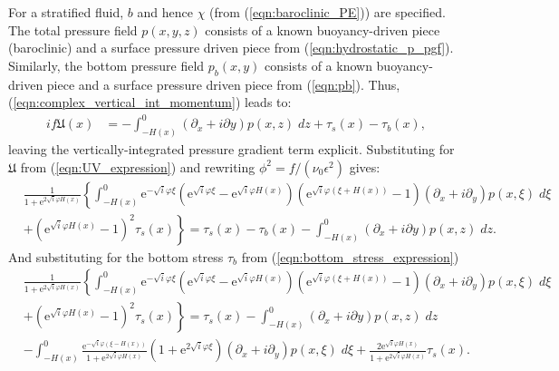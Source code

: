 \documentclass[10pt]{amsart}
\begin{document}
For a stratified fluid, $b$ and hence $\chi$ (from (\ref{eqn:baroclinic_PE})) are specified. 
The total pressure field $p(x,y,z)$ consists of a known buoyancy-driven piece (baroclinic) and a surface pressure driven piece from (\ref{eqn:hydrostatic_p_pgf}).
Similarly, the bottom pressure field $p_b(x,y)$ consists of a known buoyancy-driven piece and a surface pressure driven piece from (\ref{eqn:pb}).
Thus, (\ref{eqn:complex_vertical_int_momentum}) leads to:
\begin{align}
i f \mathfrak{U}(x) & = -
\int_{-H(x)}^{0} \left( \partial_x + i \partial y \right) p(x,z) \; dz 
+ \tau_s(x)  - \tau_b (x) ,
 \end{align}
 leaving the vertically-integrated pressure gradient term explicit.
 Substituting for $\mathfrak{U}$ from (\ref{eqn:UV_expression}) and rewriting $\phi^2 = f / (\nu_0 \epsilon^2)$ gives:
 \begin{align}
& \frac{1 }{{ 1 + \mathrm{e}^{2 \sqrt{i} \varphi H(x )} } } 
\left\{
 \int_{-H(x)}^{0} 
\mathrm{e}^{-\sqrt{i} \varphi \xi} 
\left(
\mathrm{e}^{\sqrt{i} \varphi \xi} - 
\mathrm{e}^{\sqrt{i} \varphi H(x)} 
\right) \left(
\mathrm{e}^{\sqrt{i} \varphi  \left( \xi + H(x) \right)} - 1
\right)
 \left( \partial_x  + i \partial_y  \right) p( x, \xi)  \; d \xi  \right. \nonumber \\
& + \left.
\left( 
\mathrm{e}^{\sqrt{i} \varphi  H(x) }   - 1   
\right)^2
\tau_s (x)  \right\} 
= 
\tau_s (x)  - \tau_b (x) - 
\int_{-H(x)}^{0} \left( \partial_x + i \partial y \right) p(x,z) \; dz .
\end{align}
And substituting for the bottom stress $\tau_b$ from (\ref{eqn:bottom_stress_expression})
 \begin{align}
& \frac{1 }{{1 + \mathrm{e}^{2 \sqrt{i} \varphi H(x )} } } 
\left\{
 \int_{-H(x)}^{0} 
\mathrm{e}^{-\sqrt{i} \varphi \xi} 
\left(
\mathrm{e}^{\sqrt{i} \varphi \xi} - 
\mathrm{e}^{\sqrt{i} \varphi H(x)} 
\right) \left(
\mathrm{e}^{\sqrt{i} \varphi  \left( \xi + H(x) \right)} - 1
\right)
 \left( \partial_x  + i \partial_y  \right) p( x, \xi) \; d \xi  \right. \nonumber \\
& +\left.
\left( 
\mathrm{e}^{\sqrt{i} \varphi  H(x) }   - 1   
\right)^2
\tau_s (x)   \right\} 
 =
 \tau_s (x)
 - \int_{-H(x)}^{0} \left( \partial_x + i \partial y \right) p(x,z) \; dz  
 \nonumber \\
&- 
\int_{-H(x)}^{0} 
\frac{ \mathrm{e}^{-\sqrt{i} \varphi (\xi - H(x))  } }{ 1 + \mathrm{e}^{2 \sqrt{i} \varphi H \left(x \right)} }
\left( 1 + \mathrm{e}^{2 \sqrt{i} \varphi \xi}\right) 
 \left( \partial_x  + i \partial_y \right) p( x, \xi)  \; d \xi 
+\frac{ 2 \mathrm{e}^{\sqrt{i} \varphi H(x)  } }{ 1 + \mathrm{e}^{2 \sqrt{i} \varphi H \left(x \right)} }
\tau_s (x)
. \nonumber
\end{align}
\end{document}
